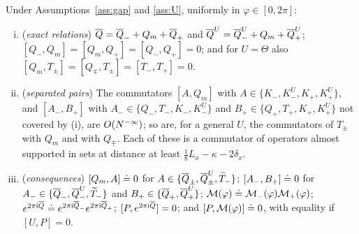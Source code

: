 \begin{lemma}\label{lem:commutation}
Under Assumptions~\ref{ass:gap} and \ref{ass:U}, uniformly in $\varphi\in[0,2\pi]$:
\begin{enumerate}[(i)]
\item (\emph{exact relations}) $\overline{Q}=\overline{Q}_-+Q_m+\overline{Q}_+$ and $\overline{Q}^U=\overline{Q}^U_-+Q_m+\overline{Q}^U_+$; $[Q_-,Q_m]=[Q_m,Q_+]=[Q_-,Q_+]=0$; and for
$U=\Theta$ also $[Q_m,T_\pm]=[Q_\mp,T_\pm]=[T_-,T_+]=0$.
\item (\emph{separated pairs}) The commutators $[A,Q_m]$ with $A\in\{K_-,K^U_-,K_+,K^U_+\}$, and $[A_-,B_+]$ with
$A_-\in\{Q_-,T_-,K_-,K^U_-\}$ and $B_+\in\{Q_+,T_+,K_+,K^U_+\}$ not covered by (i), are $O(N^{-\infty})$; so are, for a
general $U$, the commutators of $T_\pm$ with $Q_m$ and with $Q_\mp$. Each of these is a commutator of operators
almost supported in sets at distance at least $\frac18L_x-\kappa-2\delta_x$.
\item (\emph{consequences}) $[Q_m,A]\doteq0$ for $A\in\{\overline{Q}_\pm,\overline{Q}^U_\pm,\widetilde{T}_{-}\}$; $[A_-,B_+]\doteq0$ for
$A_-\in\{\overline{Q}_-,\overline{Q}^U_-,\widetilde{T}_{-}\}$ and $B_+\in\{\overline{Q}_+,\overline{Q}^U_+\}$; $\mathcal M(\varphi)\doteq \mathcal M_-(\varphi)\mathcal M_+(\varphi)$;
$e^{2\pi\mathrm{i}\overline{Q}}\doteq e^{2\pi\mathrm{i}\overline{Q}_-}e^{2\pi\mathrm{i}\overline{Q}_+}$; $[P,e^{2\pi\mathrm{i}\overline{Q}}]=0$; and $[P,\mathcal M(\varphi)]\doteq0$, with equality if
$[U,P]=0$.
\end{enumerate}
\end{lemma}

